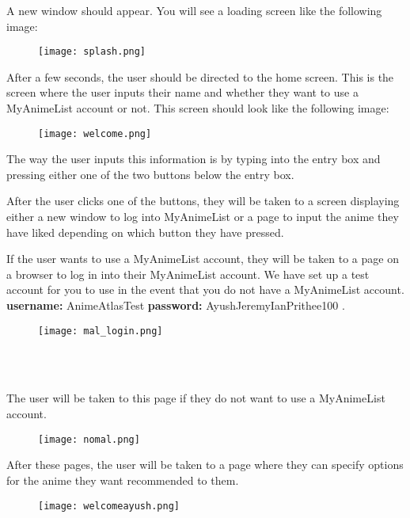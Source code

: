 \documentclass[fontsize=11pt]{article}
\begin{document}
\item[] A new window should appear. You will see a loading screen like the following image:
\begin{figure}[htp]
    \centering
    \texttt{[image: splash.png]}
\end{figure}

\item[] After a few seconds, the user should be directed to the home screen. This is the screen where the user inputs their name and whether they want to use a MyAnimeList account or not. This screen should look like the following image:

\begin{figure}[htp]
    \centering
    \texttt{[image: welcome.png]}
\end{figure}

\item[] The way the user inputs this information is by typing into the entry box and pressing either one of the two buttons below the entry box.

\item After the user clicks one of the buttons, they will be taken to a screen displaying either a new window to log into MyAnimeList or a page to input the anime they have liked depending on which button they have pressed. \\

\newpage
\item[]If the user wants to use a MyAnimeList account, they will be taken to a page on a browser to log in into their MyAnimeList account. We have set up a test account for you to use in the event that you do not have a MyAnimeList account. 
\textbf{username:} AnimeAtlasTest \textbf{password:} AyushJeremyIanPrithee100 .

\begin{figure}[htp]
    \centering
    \texttt{[image: mal\_login.png]}
\end{figure}
\\
\\
\item[] The user will be taken to this page if they do not want to use a MyAnimeList account. 

\begin{figure}[htp]
    \centering
    \texttt{[image: nomal.png]}
\end{figure}


\item[]After these pages, the user will be taken to a page where they can specify options for the anime they want recommended to them.
\begin{figure}[htp]
    \centering
    \texttt{[image: welcomeayush.png]}
\end{figure}
\end{document}
